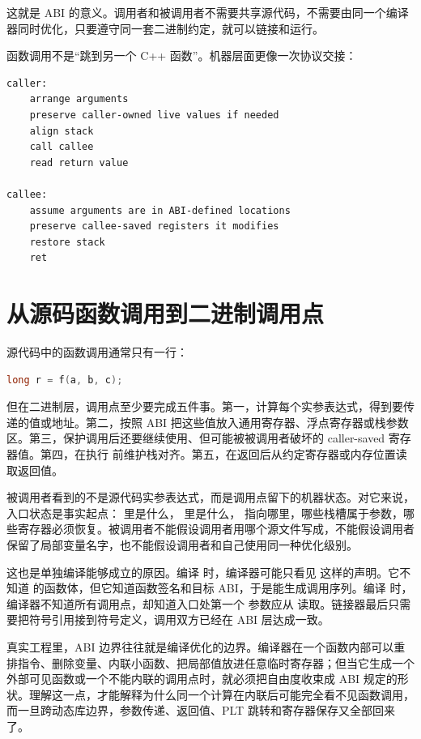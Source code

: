 这就是 ABI 的意义。调用者和被调用者不需要共享源代码，不需要由同一个编译器同时优化，只要遵守同一套二进制约定，就可以链接和运行。

\begin{mentalmodel}
函数调用不是“跳到另一个 C++ 函数”。机器层面更像一次协议交接：
\begin{lstlisting}
caller:
    arrange arguments
    preserve caller-owned live values if needed
    align stack
    call callee
    read return value

callee:
    assume arguments are in ABI-defined locations
    preserve callee-saved registers it modifies
    restore stack
    ret
\end{lstlisting}
\end{mentalmodel}

\section{从源码函数调用到二进制调用点}

源代码中的函数调用通常只有一行：

\begin{lstlisting}[language=C++]
long r = f(a, b, c);
\end{lstlisting}

但在二进制层，调用点至少要完成五件事。第一，计算每个实参表达式，得到要传递的值或地址。第二，按照 ABI 把这些值放入通用寄存器、浮点寄存器或栈参数区。第三，保护调用后还要继续使用、但可能被被调用者破坏的 caller-saved 寄存器值。第四，在执行  前维护栈对齐。第五，在返回后从约定寄存器或内存位置读取返回值。

被调用者看到的不是源代码实参表达式，而是调用点留下的机器状态。对它来说，入口状态是事实起点： 里是什么， 里是什么， 指向哪里，哪些栈槽属于参数，哪些寄存器必须恢复。被调用者不能假设调用者用哪个源文件写成，不能假设调用者保留了局部变量名字，也不能假设调用者和自己使用同一种优化级别。

这也是单独编译能够成立的原因。编译  时，编译器可能只看见  这样的声明。它不知道  的函数体，但它知道函数签名和目标 ABI，于是能生成调用序列。编译  时，编译器不知道所有调用点，却知道入口处第一个  参数应从  读取。链接器最后只需要把符号引用接到符号定义，调用双方已经在 ABI 层达成一致。

真实工程里，ABI 边界往往就是编译优化的边界。编译器在一个函数内部可以重排指令、删除变量、内联小函数、把局部值放进任意临时寄存器；但当它生成一个外部可见函数或一个不能内联的调用点时，就必须把自由度收束成 ABI 规定的形状。理解这一点，才能解释为什么同一个计算在内联后可能完全看不见函数调用，而一旦跨动态库边界，参数传递、返回值、PLT 跳转和寄存器保存又全部回来了。

